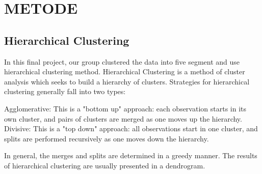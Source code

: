 \section{METODE}

\subsection{Hierarchical Clustering}
In this final project, our group clustered the data into five segment and use hierarchical clustering method. Hierarchical Clustering is a method of cluster analysis which seeks to build a hierarchy of clusters. Strategies for hierarchical clustering generally fall into two types:

    Agglomerative: This is a "bottom up" approach: each observation starts in its own cluster, and pairs of clusters are merged as one moves up the hierarchy.
    Divisive: This is a "top down" approach: all observations start in one cluster, and splits are performed recursively as one moves down the hierarchy.

In general, the merges and splits are determined in a greedy manner. The results of hierarchical clustering are usually presented in a dendrogram.
